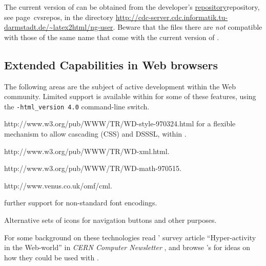 \medskip\noindent
The current version of \latextohtmlNG{} can be obtained from
the developer's \hyperref[page]{repository}{repository, see page~}{}{cvsrepos},
in the directory
\url{http://cdc-server.cdc.informatik.tu-darmstadt.de/~latex2html/ng-user}.
Beware that the files there are \emph{not} compatible with those of the
same name that come with the current version of \latextohtml.



\subsection*{Extended Capabilities in Web browsers}
The following areas are the subject of active development
within the Web community.
Limited support is available within \latextohtml{} for some of these features,
using the \texttt{-html\_version 4.0} command-line switch.
\begin{description}
%
%
%
\item [style-sheets: ] %
{http://www.w3.org/pub/WWW/TR/WD-style-970324.html}
for a flexible mechanism to allow cascading (CSS) and DSSSL,
within .
%
%
%
\item [XML: ] %
{http://www.w3.org/pub/WWW/TR/WD-xml.html}.

%
%
\item [MathML: ] %
{http://www.w3.org/pub/WWW/TR/WD-math-970515}.

%
%
\item [CML: ] %
{http://www.venus.co.uk/omf/cml}.

%
\item [Fonts: ] further support for non-standard font encodings.

%
\item [Icons: ] Alternative sets of icons for navigation buttons
and other purposes.
\end{description}
For some background on these technologies read
\Goossens' survey article ``Hyper-activity in the Web-world''
in \textsl{CERN Computer Newsletter}
,
and browse \AxelRamge's
for ideas on how they could be used with \latextohtml.



\endinput















